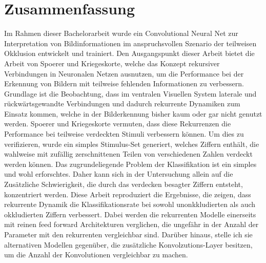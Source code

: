 \section*{Zusammenfassung}
Im Rahmen dieser Bachelorarbeit wurde ein Convolutional Neural Net zur Interpretation von Bildinformationen im anspruchsvollen Szenario der teilweisen Okklusion entwickelt und trainiert. Den Ausgangspunkt dieser Arbeit bietet die Arbeit von Spoerer und Kriegeskorte, welche das Konzept rekursiver Verbindungen in Neuronalen Netzen ausnutzen, um die Performance bei der Erkennung von Bildern mit teilweise fehlenden Informationen zu verbessern. Grundlage ist die Beobachtung, dass im ventralen Visuellen System laterale und rückwärtsgewandte Verbindungen und dadurch rekurrente Dynamiken zum Einsatz kommen, welche in der Bilderkennung bisher kaum oder gar nicht genutzt werden. Spoerer und Kriegeskorte vermuten, dass diese Rekurrenzen die Performance bei teilweise verdeckten Stimuli verbessern können. Um dies zu verifizieren, wurde ein simples Stimulus-Set generiert, welches Ziffern enthält, die wahlweise mit zufällig zerschnittenen Teilen von verschiedenen Zahlen verdeckt werden können. Das zugrundeliegende Problem der Klassifikation ist ein simples und wohl erforschtes. Daher kann sich in der Untersuchung allein auf die Zusätzliche Schwierigkeit, die durch das verdecken besagter Ziffern entsteht, konzentriert werden. Diese Arbeit reproduziert die Ergebnisse, die zeigen, dass rekurrente Dynamik die Klassifikationsrate bei sowohl unonkkludierten als auch okkludierten Ziffern verbessert. Dabei werden die rekurrenten Modelle einerseits mit reinen feed forward Architekturen verglichen, die ungefähr in der Anzahl der Parameter mit den rekurrenten vergleichbar sind. Darüber hinaus, stelle ich sie alternativen Modellen gegenüber, die zusätzliche Konvolzutions-Layer besitzen, um die Anzahl der Konvolutionen vergleichbar zu machen.
